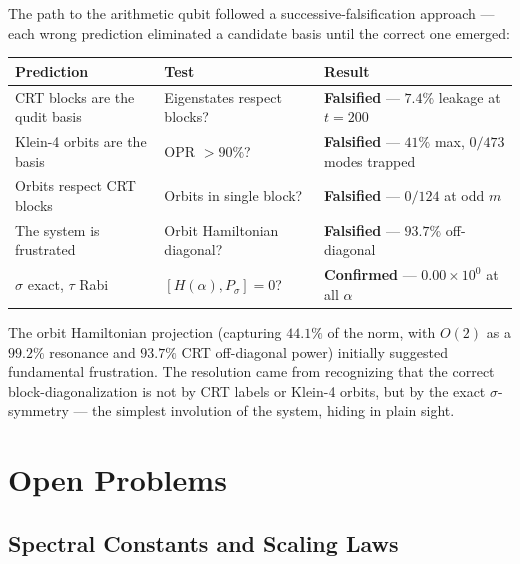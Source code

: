 \documentclass[11pt,letterpaper]{article}
\theoremstyle{definition}
\theoremstyle{remark}
\begin{document}
The path to the arithmetic qubit followed a successive-falsification approach --- each wrong prediction eliminated a candidate basis until the correct one emerged:

\begin{longtable}[]{@{}
  >{\raggedright\arraybackslash}p{}
  >{\raggedright\arraybackslash}p{}
  >{\raggedright\arraybackslash}p{}@{}}
\toprule
Prediction & Test & Result \\
\midrule
\endhead
\bottomrule
CRT blocks are the qudit basis & Eigenstates respect blocks? & \textbf{Falsified} --- $7.4\%$ leakage at $t = 200$ \\
Klein-4 orbits are the basis & OPR $> 90\%$? & \textbf{Falsified} --- $41\%$ max, $0/473$ modes trapped \\
Orbits respect CRT blocks & Orbits in single block? & \textbf{Falsified} --- $0/124$ at odd $m$ \\
The system is frustrated & Orbit Hamiltonian diagonal? & \textbf{Falsified} --- $93.7\%$ off-diagonal \\
$\sigma$ exact, $\tau$ Rabi & $[H(\alpha), P_\sigma] = 0$? & \textbf{Confirmed} --- $0.00 \times 10^{0}$ at all $\alpha$ \\
\end{longtable}

The orbit Hamiltonian projection (capturing $44.1\%$ of the norm, with $O(2)$ as a $99.2\%$ resonance and $93.7\%$ CRT off-diagonal power) initially suggested fundamental frustration. The resolution came from recognizing that the correct block-diagonalization is not by CRT labels or Klein-4 orbits, but by the exact $\sigma$-symmetry --- the simplest involution of the system, hiding in plain sight.

\section{Open Problems}\label{open-problems}

\subsection{Spectral Constants and Scaling Laws}\label{spectral-constants-and-scaling-laws}
\end{document}
